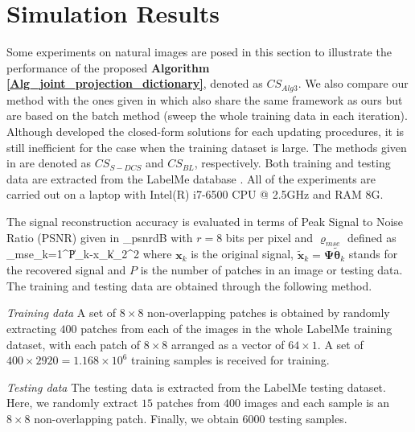 \documentclass[final,5p,times,twocolumn]{elsarticle}
\begin{document}
\section{Simulation Results}\label{S_4}
Some experiments on natural images are posed in this section to illustrate the performance of the proposed {\bf Algorithm \ref{Alg_joint_projection_dictionary}}, denoted as $CS_{Alg3}$. We also compare our method with the ones given in \cite{DCS09,BLLLJC15} which also share the same framework as ours but are based on the batch method (sweep the whole training data in each iteration). Although \cite{BLLLJC15} developed the closed-form solutions for each updating procedures, it is still inefficient for the case when the training dataset is large. The methods given in \cite{DCS09,BLLLJC15} are denoted as $CS_{S-DCS}$ and $CS_{BL}$, respectively. Both training and testing data are extracted from the LabelMe database \cite{RTF}. All of the experiments are carried out on a laptop with Intel(R) i7-6500 CPU @ 2.5GHz and RAM 8G.

The signal reconstruction accuracy is evaluated in terms of Peak Signal to Noise Ratio (PSNR) given in \cite{E10}
\en
\varrho_{psnr}\times {}dB
\een
with $r=8$ bits per pixel and $\varrho_{mse}$ defined as
\en
\varrho_{mse}\triangleq {}\sum\limits_{k=1}^{P}\|_k-\bm x_k\|_2^2
\een
where $\bm x_k$ is the original signal, $\tilde{\bm x}_k=\bm\Psi\tilde{\bm\theta}_k$  stands for the recovered signal and $P$ is the number of patches in an image or testing data. The training and testing data are obtained through the following method.

\vspace{3pt}
\noindent \emph{Training data} A set of $8\times 8$ non-overlapping patches is obtained by randomly extracting $400$ patches from each of the images in the whole LabelMe training dataset, with each patch of $8\times 8$ arranged as a vector of $64\times 1$. A set of $400\times2920=1.168\times10^6$ training samples is received for training.

\vspace{3pt}
\noindent\emph{Testing data} The testing data is extracted from the LabelMe testing dataset. Here, we randomly extract $15$ patches from $400$ images and each sample is an $8\times 8$ non-overlapping patch. Finally, we obtain $6000$ testing samples.
\vspace{3pt}
\end{document}
